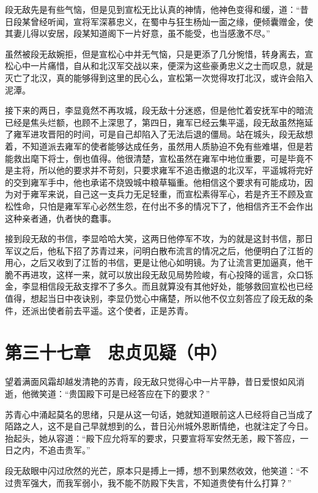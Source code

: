 段无敌先是有些气恼，但是见到宣松无比认真的神情，他神色变得和缓，道：“昔日段某曾经听闻，宣将军深慕忠义，在蜀中与狂生杨灿一面之缘，便倾囊赠金，使其妻儿得以安居，段某知道阁下一片好意，虽不能受，也当感激不尽。”

虽然被段无敌婉拒，但是宣松心中并无气恼，只是更添了几分惋惜，转身离去，宣松心中一片痛惜，自从和北汉军交战以来，便深为这些豪勇忠义之士而叹息，就是灭亡了北汉，真的能够得到这里的民心么，宣松第一次觉得攻打北汉，或许会陷入泥潭。

接下来的两日，李显竟然不再攻城，段无敌十分迷惑，但是他忙着安抚军中的暗流已经是焦头烂额，也顾不上深思了，第四日，雍军已经云集平遥，段无敌虽然拖延了雍军进攻晋阳的时间，可是自己却陷入了无法后退的僵局。站在城头，段无敌想着，不知道派去雍军的使者能够达成任务，虽然用人质胁迫不免有些难堪，但是若能救出麾下将士，倒也值得。他很清楚，宣松虽然在雍军中地位重要，可是毕竟不是主将，所以他的要求并不苛刻，只要求雍军不追击撤退的北汉军，平遥城将完好的交到雍军手中，他也承诺不烧毁城中粮草辎重。他相信这个要求有可能成功，因为对于雍军来说，自己这一支兵力无足轻重，而宣松素得军心，若是齐王不顾及宣松性命，只怕是雍军军心必然生怨，在付出不多的情况下了，他相信齐王不会作出这种亲者通，仇者快的蠢事。

接到段无敌的书信，李显哈哈大笑，这两日他停军不攻，为的就是这封书信，那日军议之后，他私下招了苏青过来，问明白散布流言的情况之后，他便明白了江哲的用心，之后又收到了江哲的书信，更是让他心如明镜。为了让流言更加逼真，他干脆不再进攻，这样一来，就可以放出段无敌见局势险峻，有心投降的谣言，众口铄金，李显相信段无敌支撑不了多久。而且就算没有其他好处，能够救回宣松也已经值得，想起当日中夜诀别，李显仍觉心中痛楚，所以他不仅立刻答应了段无敌的条件，还派出使者前去平遥。这个使者，正是苏青。

\chapter{第三十七章　忠贞见疑（中）}

望着满面风霜却越发清艳的苏青，段无敌只觉得心中一片平静，昔日爱恨如风消逝，他微笑道：“贵国殿下可是已经答应在下的要求？”

苏青心中涌起莫名的思绪，只是从这一句话，她就知道眼前这人已经将自己当成了陌路之人，这不是自己早就想到的么，昔日沁州城外恩断情绝，也就注定了今日。抬起头，她从容道：“殿下应允将军的要求，只要宣将军安然无恙，殿下答应，一日之内，不追击贵军。”

段无敌眼中闪过欣然的光芒，原本只是搏上一搏，想不到果然收效，他笑道：“不过贵军强大，而我军弱小，我不能不防殿下失言，不知道贵使有什么打算？”

